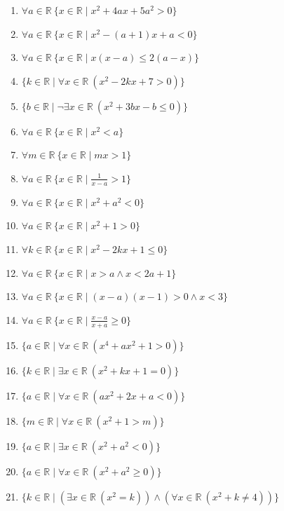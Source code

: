 \documentclass[11pt,a4paper]{article}
\begin{document}
\begin{enumerate}
\item $\displaystyle \forall a \in \mathbb{R}\ \{x \in \mathbb{R} \mid x^{2} + 4ax + 5a^{2} > 0\}$
\item $\displaystyle \forall a \in \mathbb{R}\ \{x \in \mathbb{R} \mid x^{2} - (a + 1)x + a < 0\}$
\item $\displaystyle \forall a \in \mathbb{R}\ \{x \in \mathbb{R} \mid x(x - a) \le 2(a - x)\}$
\item $\displaystyle \{k \in \mathbb{R} \mid \forall x \in \mathbb{R}\ (x^{2} - 2kx + 7 > 0)\}$
\item $\displaystyle \{b \in \mathbb{R} \mid \lnot \exists x \in \mathbb{R}\ (x^{2} + 3bx - b \le 0)\}$
\item $\displaystyle \forall a \in \mathbb{R}\ \{x \in \mathbb{R} \mid x^{2} < a\}$
\item $\displaystyle \forall m \in \mathbb{R}\ \{x \in \mathbb{R} \mid mx > 1\}$
\item $\displaystyle \forall a \in \mathbb{R}\ \{x \in \mathbb{R} \mid \frac{1}{x - a} > 1\}$
\item $\displaystyle \forall a \in \mathbb{R}\ \{x \in \mathbb{R} \mid x^{2} + a^{2} < 0\}$
\item $\displaystyle \forall a \in \mathbb{R}\ \{x \in \mathbb{R} \mid x^{2} + 1 > 0\}$
\item $\displaystyle \forall k \in \mathbb{R}\ \{x \in \mathbb{R} \mid x^{2} - 2kx + 1 \le 0\}$
\item $\displaystyle \forall a \in \mathbb{R}\ \{x \in \mathbb{R} \mid x > a \land x < 2a + 1\}$
\item $\displaystyle \forall a \in \mathbb{R}\ \{x \in \mathbb{R} \mid (x - a)(x - 1) > 0 \land x < 3\}$
\item $\displaystyle \forall a \in \mathbb{R}\ \{x \in \mathbb{R} \mid \frac{x - a}{x + a} \ge 0\}$
\item $\displaystyle \{a \in \mathbb{R} \mid \forall x \in \mathbb{R}\ (x^{4} + ax^{2} + 1 > 0)\}$
\item $\displaystyle \{k \in \mathbb{R} \mid \exists x \in \mathbb{R}\ (x^{2} + kx + 1 = 0)\}$
\item $\displaystyle \{a \in \mathbb{R} \mid \forall x \in \mathbb{R}\ (ax^{2} + 2x + a < 0)\}$
\item $\displaystyle \{m \in \mathbb{R} \mid \forall x \in \mathbb{R}\ (x^{2} + 1 > m)\}$
\item $\displaystyle \{a \in \mathbb{R} \mid \exists x \in \mathbb{R}\ (x^{2} + a^{2} < 0)\}$
\item $\displaystyle \{a \in \mathbb{R} \mid \forall x \in \mathbb{R}\ (x^{2} + a^{2} \ge 0)\}$
\item $\displaystyle \{k \in \mathbb{R} \mid \left(\exists x \in \mathbb{R}\ (x^{2} = k)\right) \land \left(\forall x \in \mathbb{R}\ (x^{2} + k \neq 4)\right)\}$
\end{enumerate}
\end{document}
